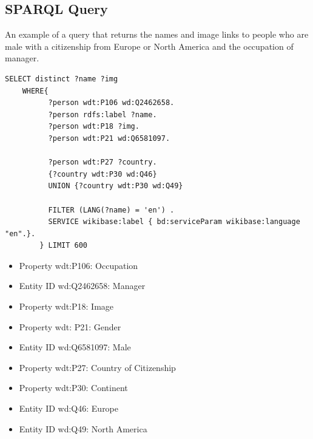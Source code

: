 \documentclass[12pt,english]{article}
\begin{document}
\begin{appendices}
\section{SPARQL Query}
\label{appen1}
An example of a query that returns the names and image links to people who are male with a citizenship from Europe or North America and the occupation of manager.
 
\begin{verbatim}
SELECT distinct ?name ?img
    WHERE{
          ?person wdt:P106 wd:Q2462658.
          ?person rdfs:label ?name.
          ?person wdt:P18 ?img.
          ?person wdt:P21 wd:Q6581097.
          
          ?person wdt:P27 ?country.
          {?country wdt:P30 wd:Q46} 
          UNION {?country wdt:P30 wd:Q49}
          
          FILTER (LANG(?name) = 'en') .
          SERVICE wikibase:label { bd:serviceParam wikibase:language "en".}.
        } LIMIT 600
\end{verbatim}

\begin{itemize}
\item Property wdt:P106: Occupation
\item Entity ID wd:Q2462658: Manager
\item Property wdt:P18: Image
\item Property wdt: P21: Gender
\item Entity ID wd:Q6581097: Male
\item Property wdt:P27: Country of Citizenship
\item Property wdt:P30: Continent
\item Entity ID wd:Q46: Europe
\item Entity ID wd:Q49: North America
\end{itemize}


\end{appendices}

\nocite{*}

\printbibliography
\end{document}
